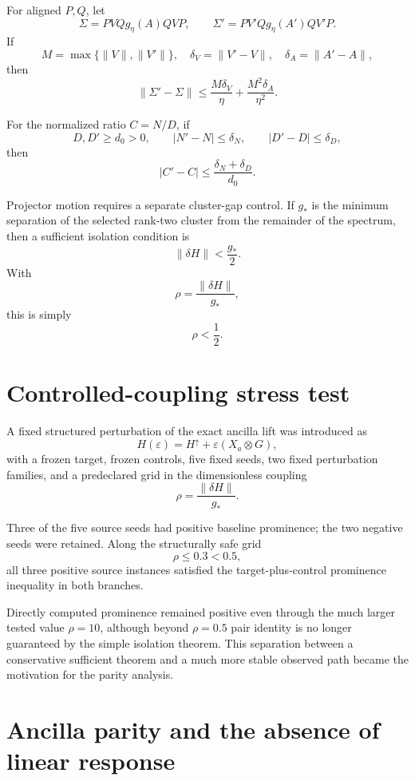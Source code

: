 \documentclass[11pt,a4paper]{article}
\newcommand{\eps}{\varepsilon}
\begin{document}
For aligned \(P,Q\), let
\[
\Sigma=PVQg_\eta(A)QVP,
\qquad
\Sigma'=PV'Qg_\eta(A')QV'P.
\]
If
\[
M=\max\{\|V\|,\|V'\|\},
\quad
\delta_V=\|V'-V\|,
\quad
\delta_A=\|A'-A\|,
\]
then
\[
\boxed{
\|\Sigma'-\Sigma\|
\le
\frac{M\delta_V}{\eta}
+
\frac{M^2\delta_A}{\eta^2}.
}
\]

For the normalized ratio \(C=N/D\), if
\[
D,D'\ge d_0>0,
\qquad
|N'-N|\le\delta_N,
\qquad
|D'-D|\le\delta_D,
\]
then
\[
\boxed{
|C'-C|
\le
\frac{\delta_N+\delta_D}{d_0}.
}
\]

Projector motion requires a separate cluster-gap control.  If \(g_*\) is the
minimum separation of the selected rank-two cluster from the remainder of the
spectrum, then a sufficient isolation condition is
\[
\|\delta H\|<\frac{g_*}{2}.
\]
With
\[
\rho=\frac{\|\delta H\|}{g_*},
\]
this is simply
\[
\rho<\frac12.
\]

\section{Controlled-coupling stress test}

A fixed structured perturbation of the exact ancilla lift was introduced as
\[
H(\eps)
=
H^\uparrow+\eps(X_a\otimes G),
\]
with a frozen target, frozen controls, five fixed seeds, two fixed perturbation
families, and a predeclared grid in the dimensionless coupling
\[
\rho=\frac{\|\delta H\|}{g_*}.
\]

Three of the five source seeds had positive baseline prominence; the two
negative seeds were retained.  Along the structurally safe grid
\[
\rho\le0.3<0.5,
\]
all three positive source instances satisfied the target-plus-control
prominence inequality in both branches.

Directly computed prominence remained positive even through the much larger
tested value \(\rho=10\), although beyond \(\rho=0.5\) pair identity is no
longer guaranteed by the simple isolation theorem.  This separation between
a conservative sufficient theorem and a much more stable observed path became
the motivation for the parity analysis.

\section{Ancilla parity and the absence of linear response}
\end{document}
